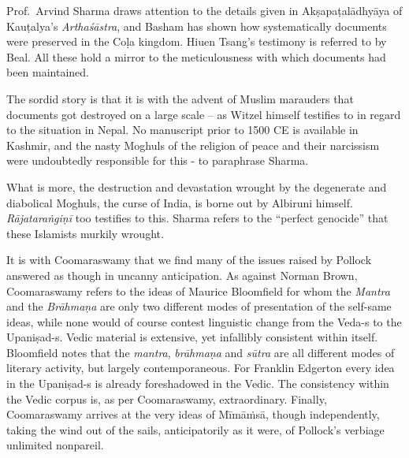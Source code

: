 \vskip 2pt

Prof.~Arvind Sharma draws attention to the details given in Akṣapaṭalādhyāya of Kauṭalya’s \textit{Arthaśāstra}, and Basham has shown how systematically documents were preserved in the Coḷa kingdom. Hiuen Tsang’s testimony is referred to by Beal. All these hold a mirror to the meticulousness with which documents had been maintained. 

The sordid story is that it is with the advent of Muslim marauders that documents got destroyed on a large scale – as Witzel himself testifies to in regard to the situation in Nepal. No manuscript prior to 1500 CE is available in Kashmir, and the nasty Moghuls of the religion of peace and their narcissism were undoubtedly responsible for this - to paraphrase Sharma.

What is more, the destruction and devastation wrought by the degenerate and diabolical Moghuls, the curse of India, is borne out by Albiruni himself. \textit{Rājataraṅgiṇī} too testifies to this. Sharma refers to the “perfect genocide” that these Islamists murkily wrought.

It is with Coomaraswamy that we find many of the issues raised by Pollock answered as though in uncanny anticipation. As against Norman Brown, Coomaraswamy refers to the ideas of Maurice Bloomfield for whom the \textit{Mantra} and the \textit{Brāhmaṇa} are only two different modes of presentation of the self-same ideas, while none would of course contest linguistic change from the Veda-s to the Upaniṣad-s. Vedic material is extensive, yet infallibly consistent within itself. Bloomfield notes that the \textit{mantra}, \textit{brāhmaṇa} and \textit{sūtra} are all different modes of literary activity, but largely contemporaneous. For Franklin Edgerton every idea in the Upaniṣad-s is already foreshadowed in the Vedic. The consistency within the Vedic corpus is, as per Coomaraswamy, extraordinary. Finally, Coomaraswamy arrives at the very ideas of Mīmāṁsā, though independently, taking the wind out of the sails, anticipatorily as it were, of Pollock's verbiage unlimited nonpareil. 


